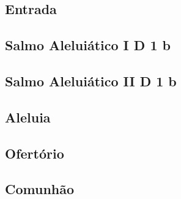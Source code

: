 
\subsection{Entrada}\label{subsection:tempus-paschale/missa-1/introitus}

\subsection[Salmo Aleluiático I]{Salmo Aleluiático I \textmd{D 1 b}}\label{subsection:tempus-paschale/missa-1/psalmus-alleluiaticus-1}

\AllowPageFlush

\subsection[Salmo Aleluiático II]{Salmo Aleluiático II \textmd{D 1 b}}\label{subsection:tempus-paschale/missa-1/psalmus-alleluiaticus-2}

\AllowPageFlush

\subsection{Aleluia}\label{subsection:tempus-paschale/missa-1/alleluia}

\AllowPageFlush

\subsection{Ofertório}\label{subsection:tempus-paschale/missa-1/offertorium}

\AllowPageFlush

\subsection{Comunhão}\label{subsection:tempus-paschale/missa-1/communio}
